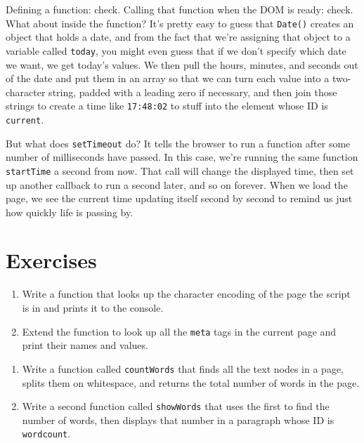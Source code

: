 Defining a function: check.
Calling that function when the DOM is ready: check.
What about inside the function?
It's pretty easy to guess that \texttt{Date()} creates an object that holds a date,
and from the fact that we're assigning that object to a variable called \texttt{today},
you might even guess that if we don't specify which date we want,
we get today's values.
We then pull the hours, minutes, and seconds out of the date and put them in an array
so that we can turn each value into a two-character string,
padded with a leading zero if necessary,
and then join those strings to create a time like \texttt{17:48:02}
to stuff into the element whose ID is \texttt{current}.

But what does \texttt{setTimeout} do?
It tells the browser to run a function after some number of milliseconds have passed.
In this case,
we're running the same function \texttt{startTime} a second from now.
That call will change the displayed time,
then set up another callback to run a second later,
and so on forever.
When we load the page,
we see the current time updating itself second by second
to remind us just how quickly life is passing by.

\section{Exercises}\label{s:pages-exercises}


\begin{enumerate}
\item
  Write a function that looks up the character encoding of the page the script is in
  and prints it to the console.
\item
  Extend the function to look up all the \texttt{meta} tags in the current page
  and print their names and values.
\end{enumerate}


\begin{enumerate}
\item
  Write a function called \texttt{countWords} that finds all the text nodes in a page,
  splits them on whitespace,
  and returns the total number of words in the page.
\item
  Write a second function called \texttt{showWords} that uses the first to find the number of words,
  then displays that number in a paragraph whose ID is \texttt{wordcount}.
\end{enumerate}

